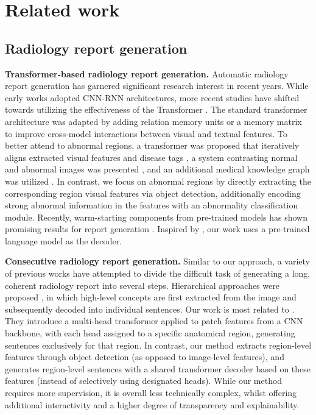 \documentclass[10pt,twocolumn,letterpaper]{article}
\begin{document}
\section{Related work}
\subsection{Radiology report generation}

\noindent\textbf{Transformer-based radiology report generation.} Automatic radiology report generation has garnered significant research interest in recent years. While early works \cite{wang2018tienet, jing2018automatic, li2018hybrid, jing2019show, zhang2020radiology} adopted CNN-RNN architectures, more recent studies have shifted towards utilizing the effectiveness of the Transformer \cite{vaswani2017attention}. The standard transformer architecture was adapted by adding relation memory units \cite{chen2020generating} or a memory matrix \cite{chen2021cross} to improve cross-model interactions between visual and textual features. To better attend to abnormal regions, a transformer was proposed that iteratively aligns extracted visual features and disease tags \cite{you2021aligntransformer}, a system contrasting normal and abnormal images was presented \cite{liu2021contrastive}, and an additional medical knowledge graph was utilized \cite{liu2021exploring}. In contrast, we focus on abnormal regions by directly extracting the corresponding region visual features via object detection, additionally encoding strong abnormal information in the features with an abnormality classification module. 
Recently, warm-starting components from pre-trained models has shown promising results for report generation \cite{nicolson2022improving}. 
Inspired by \cite{alfarghaly2021automated}, our work uses a pre-trained language model as the decoder.

\noindent\textbf{Consecutive radiology report generation.} Similar to our approach, a variety of previous works have attempted to divide the difficult task of generating a long, coherent radiology report into several steps. Hierarchical approaches were proposed \cite{liu2019clinically, nooralahzadeh2021progressive}, in which high-level concepts are first extracted from the image and subsequently decoded into individual sentences. Our work is most related to \cite{wang2022inclusive}. They introduce a multi-head transformer applied to patch features from a CNN backbone, with each head assigned to a specific anatomical region, generating sentences exclusively for that region.
In contrast, our method extracts region-level features through object detection (as opposed to image-level features), and generates region-level sentences with a shared transformer decoder based on these features (instead of selectively using designated heads).
While our method requires more supervision, it is overall less technically complex, whilst offering additional interactivity and a higher degree of transparency and explainability.
\end{document}
